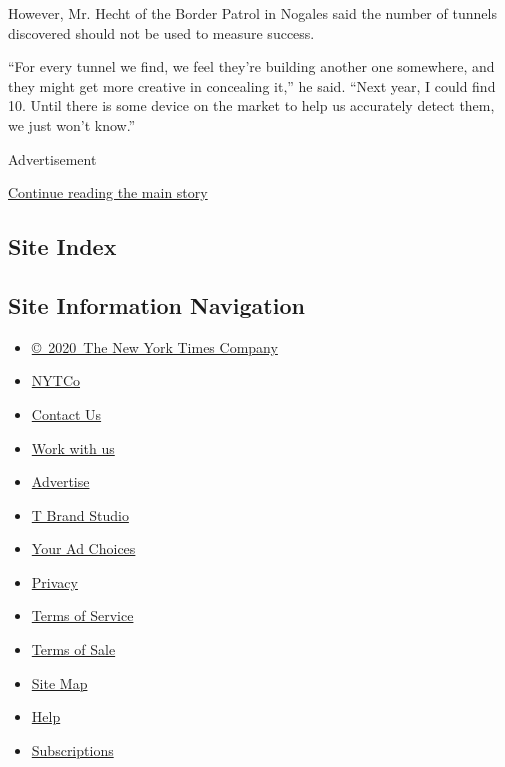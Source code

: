 However, Mr. Hecht of the Border Patrol in Nogales said the number of
tunnels discovered should not be used to measure success.

``For every tunnel we find, we feel they're building another one
somewhere, and they might get more creative in concealing it,'' he said.
``Next year, I could find 10. Until there is some device on the market
to help us accurately detect them, we just won't know.''

Advertisement

\protect\hyperlink{after-bottom}{Continue reading the main story}

\hypertarget{site-index}{%
\subsection{Site Index}\label{site-index}}

\hypertarget{site-information-navigation}{%
\subsection{Site Information
Navigation}\label{site-information-navigation}}

\begin{itemize}
\tightlist
\item
  \href{https://help.nytimes.com/hc/en-us/articles/115014792127-Copyright-notice}{©~2020~The
  New York Times Company}
\end{itemize}

\begin{itemize}
\tightlist
\item
  \href{https://www.nytco.com/}{NYTCo}
\item
  \href{https://help.nytimes.com/hc/en-us/articles/115015385887-Contact-Us}{Contact
  Us}
\item
  \href{https://www.nytco.com/careers/}{Work with us}
\item
  \href{https://nytmediakit.com/}{Advertise}
\item
  \href{http://www.tbrandstudio.com/}{T Brand Studio}
\item
  \href{https://www.nytimes.com/privacy/cookie-policy\#how-do-i-manage-trackers}{Your
  Ad Choices}
\item
  \href{https://www.nytimes.com/privacy}{Privacy}
\item
  \href{https://help.nytimes.com/hc/en-us/articles/115014893428-Terms-of-service}{Terms
  of Service}
\item
  \href{https://help.nytimes.com/hc/en-us/articles/115014893968-Terms-of-sale}{Terms
  of Sale}
\item
  \href{https://spiderbites.nytimes.com}{Site Map}
\item
  \href{https://help.nytimes.com/hc/en-us}{Help}
\item
  \href{https://www.nytimes.com/subscription?campaignId=37WXW}{Subscriptions}
\end{itemize}

